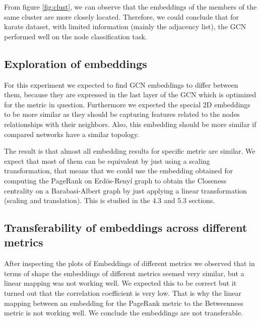 \documentclass[a4paper]{article}
\begin{document}
From figure \ref{fig:clust}, we can observe that the embeddings of the members of the same cluster are more closely located. Therefore, we could conclude that for karate dataset, with limited information (mainly the adjacency list), the GCN performed well on the node classification task.


\subsection{Exploration of embeddings}

For this experiment we expected to find GCN embeddings to differ between them, because they are expressed in the last layer of the GCN which is optimized for the metric in question.
Furthermore we expected the special 2D embeddings to be more similar as they should be capturing features related to the nodes relationships with their neighbors. Also, this embedding should be more similar if compared networks have a similar topology.

The result is that almost all embedding results for specific metric are similar. We expect that  most of them can be equivalent by just using a scaling transformation, that means that we could use the embedding obtained for computing the PageRank on Erdös-Renyí graph to obtain the Closeness centrality on a Barabasi-Albert graph by just applying a linear transformation (scaling and translation). This is studied in the 4.3 and 5.3 sections.



\subsection{Transferability of embeddings across different metrics}
After inspecting the plots of Embeddings of different metrics we observed that in terms of shape the embeddings of different metrics seemed very similar, but a linear mapping was not working well. We expected this to be correct but it turned out that the correlation coefficient is very low. That is why the linear mapping between an embedding for the PageRank metric to the Betweenness metric is not working well. We conclude the embeddings are not transferable.

\end{document}
